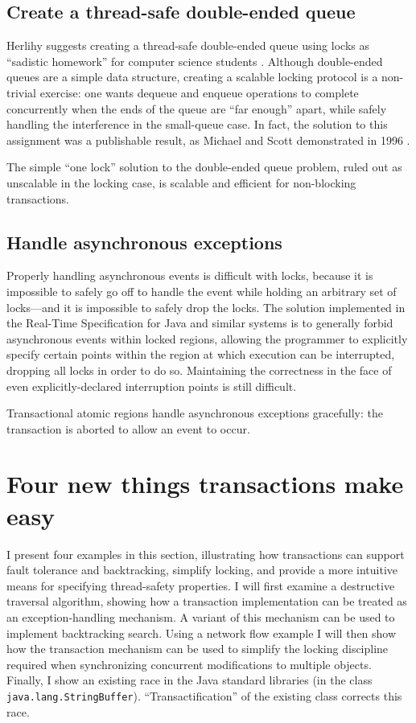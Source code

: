 \subsection{Create a thread-safe double-ended queue}
Herlihy suggests creating a thread-safe double-ended queue using locks
as ``sadistic homework'' for computer science students \cite{Herlihy05}.
Although double-ended queues are a simple data structure,
creating a scalable locking protocol is a
non-trivial exercise: one wants dequeue and enqueue operations to
complete concurrently when the ends of the queue are ``far enough''
apart, while safely handling the interference in the small-queue case.
In fact, the solution to this assignment was a publishable result, as
Michael and Scott demonstrated in 1996 \cite{MichaelSc96}.

The simple ``one lock'' solution to the double-ended queue
problem, ruled out as unscalable in the locking case, is scalable and
efficient for non-blocking transactions.

\subsection{Handle asynchronous exceptions}
Properly handling asynchronous events is difficult with locks, because
it is impossible to safely go off to handle the event while holding an
arbitrary set of locks---and it is impossible to safely drop the
locks.  The solution implemented in the Real-Time Specification for
Java and similar systems is to generally forbid asynchronous events within
locked regions, allowing the programmer to explicitly specify certain
points within the region at which execution can be interrupted,
dropping all locks in order to do so.  Maintaining the correctness
in the face of even explicitly-declared interruption points is still
difficult.

Transactional atomic regions handle asynchronous exceptions
gracefully: the transaction is aborted to allow an
event to occur.

\section{Four new things transactions make easy}

I present four examples in this section, illustrating how transactions
can support fault tolerance and backtracking, simplify locking, and
provide a more intuitive means for specifying thread-safety
properties.  I will first examine a destructive traversal algorithm,
showing how a transaction implementation can be treated as an
exception-handling mechanism.  A variant of this mechanism can be used
to implement backtracking search.  Using a network flow example I will
then show how the transaction mechanism can be used to simplify the
locking discipline required when synchronizing concurrent
modifications to multiple objects.  Finally, I show an existing race
in the Java standard libraries (in the class
\texttt{java.lang.StringBuffer}).  ``Transactification'' of the
existing class corrects this race.

